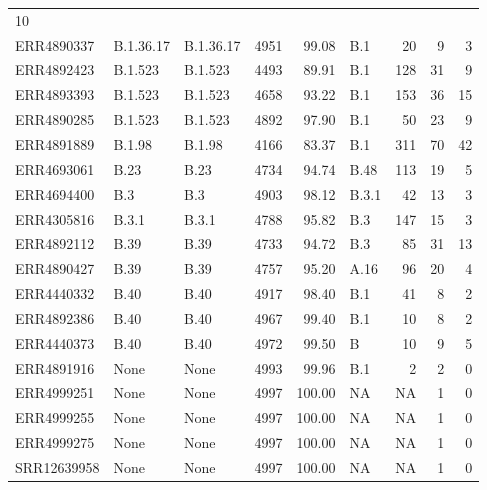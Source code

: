 \documentclass[
]{article}
\begin{document}
\begin{longtable}[]{@{}lllrrlrrr@{}}
10\tabularnewline
ERR4890337 & B.1.36.17 & B.1.36.17 & 4951 & 99.08 & B.1 & 20 & 9 &
3\tabularnewline
ERR4892423 & B.1.523 & B.1.523 & 4493 & 89.91 & B.1 & 128 & 31 &
9\tabularnewline
ERR4893393 & B.1.523 & B.1.523 & 4658 & 93.22 & B.1 & 153 & 36 &
15\tabularnewline
ERR4890285 & B.1.523 & B.1.523 & 4892 & 97.90 & B.1 & 50 & 23 &
9\tabularnewline
ERR4891889 & B.1.98 & B.1.98 & 4166 & 83.37 & B.1 & 311 & 70 &
42\tabularnewline
ERR4693061 & B.23 & B.23 & 4734 & 94.74 & B.48 & 113 & 19 &
5\tabularnewline
ERR4694400 & B.3 & B.3 & 4903 & 98.12 & B.3.1 & 42 & 13 &
3\tabularnewline
ERR4305816 & B.3.1 & B.3.1 & 4788 & 95.82 & B.3 & 147 & 15 &
3\tabularnewline
ERR4892112 & B.39 & B.39 & 4733 & 94.72 & B.3 & 85 & 31 &
13\tabularnewline
ERR4890427 & B.39 & B.39 & 4757 & 95.20 & A.16 & 96 & 20 &
4\tabularnewline
ERR4440332 & B.40 & B.40 & 4917 & 98.40 & B.1 & 41 & 8 &
2\tabularnewline
ERR4892386 & B.40 & B.40 & 4967 & 99.40 & B.1 & 10 & 8 &
2\tabularnewline
ERR4440373 & B.40 & B.40 & 4972 & 99.50 & B & 10 & 9 & 5\tabularnewline
ERR4891916 & None & None & 4993 & 99.96 & B.1 & 2 & 2 & 0\tabularnewline
ERR4999251 & None & None & 4997 & 100.00 & NA & NA & 1 &
0\tabularnewline
ERR4999255 & None & None & 4997 & 100.00 & NA & NA & 1 &
0\tabularnewline
ERR4999275 & None & None & 4997 & 100.00 & NA & NA & 1 &
0\tabularnewline
SRR12639958 & None & None & 4997 & 100.00 & NA & NA & 1 &
0\tabularnewline
\bottomrule
\end{longtable}

\normalsize

\renewcommand\refname{Bibliography}
  
\end{document}
